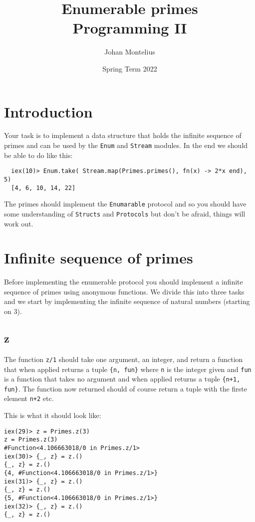 \documentclass[a4paper,11pt]{article}
\begin{document}
\title{
    \textbf{Enumerable primes}\\
    \large{Programming II}
}
\author{Johan Montelius}
\date{Spring Term 2022}
\maketitle
{}

\section*{Introduction}

Your task is to implement a data structure that holds the infinite
sequence of primes and can be used by the {\tt Enum} and {\tt Stream}
modules. In the end we should be able to do like this:

\begin{verbatim}
  iex(10)> Enum.take( Stream.map(Primes.primes(), fn(x) -> 2*x end), 5)
  [4, 6, 10, 14, 22]
\end{verbatim}

The primes should implement the {\tt Enumarable} protocol and so you
should have some understanding of {\tt Structs} and {\tt Protocols} but
don't be afraid, things will work out.

\section*{Infinite sequence of primes}

Before implementing the enumerable protocol you should implement a
infinite sequence of primes using anonymous functions. We divide this
into three tasks and we start by implementing the infinite sequence of
natural numbers (starting on 3).

\subsection*{z}

The function {\tt z/1} should take one argument, an integer, and
return a function that when applied returns a tuple {\tt \{n, fun\}}
where {\tt n} is the integer given and {\tt fun} is a function that
takes no argument and when applied returns a tuple {\tt\{n+1,
  fun\}}. The function now returned should of course return a tuple
with the firste element {\tt n+2} etc.

This is what it should look like:

\begin{verbatim}
iex(29)> z = Primes.z(3)
z = Primes.z(3)
#Function<4.106663018/0 in Primes.z/1>
iex(30)> {_, z} = z.()
{_, z} = z.()
{4, #Function<4.106663018/0 in Primes.z/1>}
iex(31)> {_, z} = z.()
{_, z} = z.()
{5, #Function<4.106663018/0 in Primes.z/1>}
iex(32)> {_, z} = z.()
{_, z} = z.()
\end{verbatim}
\end{document}

